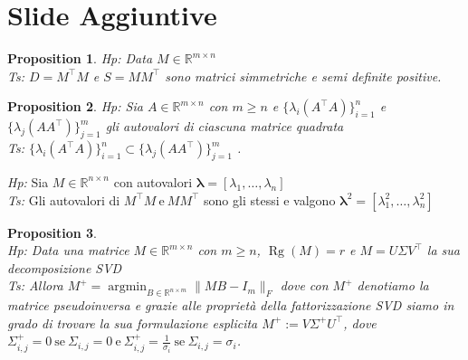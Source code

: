 \documentclass[serif]{beamer}
\newtheorem{proposition}{Proposition}
\newcommand{\R}{\mathbb{R}}
\begin{document}
\section*{Slide Aggiuntive}
\begin{frame}
\begin{proposition}\label{prop 1}
\textit{Hp:} Data $M\in\mathbb{R}^{m \times n}$\\
\textit{Ts:} $D=M^\top      M$ e $S=MM^\top      $ sono  matrici simmetriche e semi definite positive.
\end{proposition}

\begin{proposition}\label{prop 2}
\textit{Hp:} Sia $A \in \R^{m \times n}$ con $m \geq n$ e $\{\lambda_i(A^\top A)\}_{i=1}^{n}$ e $\{\lambda_j(A A^\top)\}_{j=1}^{m} $ gli autovalori di ciascuna matrice quadrata \\
\textit{Ts:} $ \{\lambda_i(A^\top A)\}_{i=1}^{n} \subset \{\lambda_j(A A^\top)\}_{j=1}^{m} $ .
\end{proposition}

\begin{corollary}
\textit{Hp:} Sia $M \in \R^{n \times n}$ con autovalori $\mathbf{\lambda}=[\lambda_1, \dots, \lambda_n ]$\\
\textit{Ts:} Gli autovalori di $M^\top      M \ \text{e} \ MM^\top      $ sono gli stessi e valgono $\mathbf{\lambda}^2=[\lambda_1^2, \dots, \lambda_n^2 ]$
\end{corollary}
\end{frame}

\begin{frame}
\begin{proposition}\label{Minim}
\textbf{}\\
\textit{Hp:} Data una matrice \( M \in \R^{m \times n} \) con \( m \geq n \), \(\operatorname*{Rg}(M) = r\) e \(M= U\Sigma V^\top \) la sua decomposizione SVD \\
\textit{Ts:} Allora \(M^+={\operatorname*{argmin}}_{B \in \R^{n \times m}}{\|MB - I_m\|_F }\) dove con \(M^+\) denotiamo la matrice pseudoinversa e grazie alle proprietà della fattorizzazione SVD siamo in grado di trovare la sua formulazione esplicita \( M^+:=V\Sigma^+U^\top \), dove \( \Sigma_{i,j}^+=0 \ \text{se} \ \Sigma_{i,j}=0 \ \text{e} \ \Sigma_{i,j}^+= \frac{1}{\sigma_i} \ \text{se} \  \Sigma_{i,j}=\sigma_i \).
\end{proposition}
\end{frame}
\end{document}
